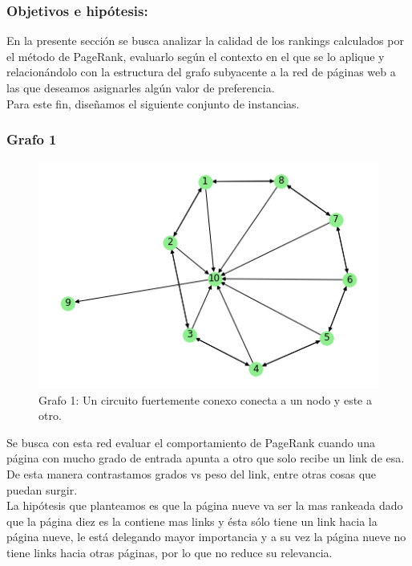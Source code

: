 \subsubsection{Objetivos e hipótesis:}

En la presente sección se busca analizar la calidad de los rankings calculados por el método de PageRank, evaluarlo según el contexto en el que se lo aplique y relacionándolo con la estructura del grafo subyacente a la red de páginas web a las que deseamos asignarles algún valor de preferencia. \\

Para este fin, diseñamos el siguiente conjunto de instancias.

\subsubsection{Grafo 1}


\begin{figure}[h]
     \begin{center}
     \includegraphics[scale=0.65]{img/prueba-circular.png} 
    \end{center}
\caption{Grafo 1: Un circuito fuertemente conexo conecta a un nodo y este a otro.} \label{fig:exp3-circular}
\end{figure}

Se busca con esta red evaluar el comportamiento de PageRank cuando una página con mucho grado de entrada apunta a otro que solo recibe un link de esa. De esta manera contrastamos grados vs peso del link, entre otras cosas que puedan surgir. \\

La hipótesis que planteamos es que la página nueve va ser la mas rankeada dado que la página diez es la contiene mas links y ésta sólo tiene un link hacia la página nueve, le está delegando mayor importancia y a su vez la página nueve no tiene links hacia otras páginas, por lo que no reduce su relevancia. \\

